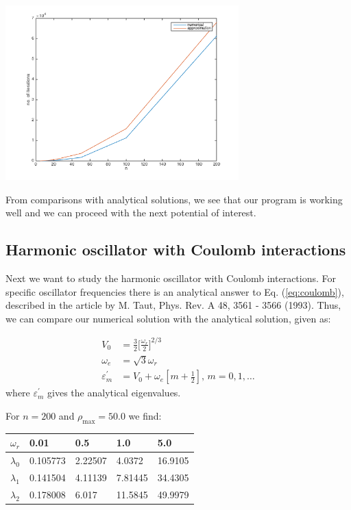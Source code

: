 \documentclass{article}
\begin{document}
\begin{multicols}{2}
\begin{center}
	\includegraphics[width=90mm]{../build-Project2-Desktop_Qt_5_5_0_clang_64bit-Debug/iterations.png} 	
	\label{fig:iterations}
\end{center}
From comparisons with analytical solutions, we see that our program is working well and we can proceed with the next potential of interest.



\subsection{Harmonic oscillator with Coulomb interactions}
Next we want to study the harmonic oscillator with Coulomb interactions. For specific oscillator frequencies there is an analytical answer to Eq. (\ref{eq:coulomb}), described in the article by M. Taut, Phys. Rev. A 48, 3561 - 3566 (1993). Thus, we can compare our numerical solution with the analytical solution, given as:

\begin{equation}
\begin{aligned}
	V_0 &= \frac{3}{2} \bigg[ \frac{\omega_r}{2} \bigg]^{2/3} \\
	\omega_e &= \sqrt{3} \omega_r \\
	\varepsilon_m^{'} &= V_0 + \omega_e [m + \frac{1}{2}] \textrm{,       } m = 0,1, \dots
\end{aligned}
\end{equation}
where $\varepsilon_m^{'}$ gives the analytical eigenvalues.

For $n = 200$ and $\rho_{\textrm{max}} = 50.0$ we find:

\begin{center}
\begin{tabular}{ l l l l l }\hline
	$\omega_r$ 	& 0.01		& 0.5		& 1.0	&5.0\\ \hline
	$\lambda_0$ 	& 0.105773	& 2.22507		& 4.0372	& 16.9105\\
	$\lambda_1$ 	& 0.141504	& 4.11139		& 7.81445	& 34.4305 \\
	$\lambda_2$ 	& 0.178008	& 6.017		& 11.5845	& 49.9979\\
	\hline
\end{tabular}
\end{center}


\end{multicols}
\end{document}
